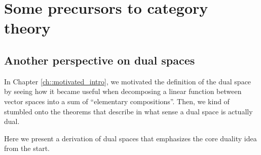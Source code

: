 \section*{Some precursors to category theory}

\subsection*{Another perspective on dual spaces}

In Chapter \ref{ch::motivated_intro}, we motivated the definition of the dual space by seeing how it became useful when decomposing a linear function between vector spaces into a sum of ``elementary compositions''. Then, we kind of stumbled onto the theorems that describe in what sense a dual space is actually dual.

Here we present a derivation of dual spaces that emphasizes the core duality idea from the start.

